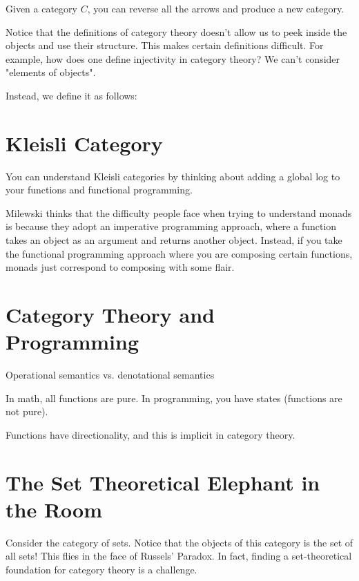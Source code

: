 \documentclass{article}
\theoremstyle{definition}
\begin{document}
Given a category $C$, you can reverse all the arrows and produce a new category.

\newpage

Notice that the definitions of category theory doesn't allow us
to peek inside the objects and use their structure. This makes
certain definitions difficult. For example, how does one define
injectivity in category theory? We can't consider "elements of
objects".

Instead, we define it as follows:

\newpage

\section{Kleisli Category}

You can understand Kleisli categories by thinking about adding a global log
to your functions and functional programming.

Milewski thinks that the difficulty people face when trying to understand monads 
is because they adopt an imperative programming approach, where a function takes
an object as an argument and returns another object. Instead, if you take the functional
programming approach where you are composing certain functions, monads just correspond
to composing with some flair.



\newpage

\section{Category Theory and Programming}

Operational semantics vs. denotational semantics

In math, all functions are pure. In programming, you have states (functions are not pure).

Functions have directionality, and this is implicit in category theory.



\newpage

\section{The Set Theoretical Elephant in the Room}

Consider the category of sets. Notice that the objects of this
category is the set of all sets! This flies in the face of Russels'
Paradox. In fact, finding a set-theoretical foundation for 
category theory is a challenge.
\end{document}
